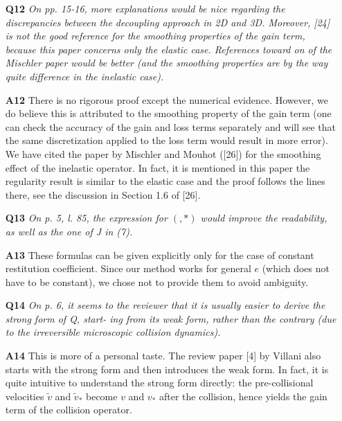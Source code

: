\documentclass[11pt]{article}
\newcommand{\mz}[1]{\textcolor{blue}{MZ: #1}}
\begin{document}
\begin{itemize}


\item[{\bf Q12}] {\it On pp. 15-16, more explanations would be nice regarding the discrepancies between the decoupling approach in 2D and 3D. Moreover, [24] is not the good reference for the smoothing properties of the gain term, because this paper concerns only the elastic case. References toward on of the Mischler paper would be better (and the smoothing properties are by the way quite difference in the inelastic case).
}

\item[{\bf A12}] There is no rigorous proof except the numerical evidence. However, we do believe this is attributed to the smoothing property of the gain term (one can check the accuracy of the gain and loss terms separately and will see that the same discretization applied to the loss term would result in more error). We have cited the paper by Mischler and Mouhot ([26]) for the smoothing effect of the inelastic operator. In fact, it is mentioned in this paper the regularity result is similar to the elastic case and the proof follows the lines there, see the discussion in Section 1.6 of [26].


\item[{\bf Q13}] {\it On p. 5, l. 85, the expression for $(,*)$ would improve the readability, as well as the one of J in (7).}

\item[{\bf A13}] These formulas can be given explicitly only for the case of constant restitution coefficient. Since our method works for general $e$ (which does not have to be constant), we chose not to provide them to avoid ambiguity. 

\item[{\bf Q14}] {\it On p. 6, it seems to the reviewer that it is usually easier to derive the strong form of Q, start- ing from its weak form, rather than the contrary (due to the irreversible microscopic collision dynamics).}

\item[{\bf A14}] This is more of a personal taste. The review paper [4] by Villani also starts with the strong form and then introduces the weak form. In fact, it is quite intuitive to understand the strong form directly: the pre-collisional velocities $\tilde{v}$ and $\tilde{v}_*$ become $v$ and $v_*$ after the collision, hence yields the gain term of the collision operator.



\end{itemize}
\end{document}
